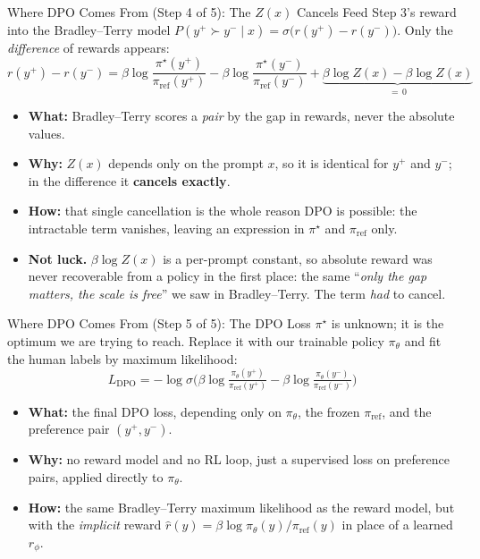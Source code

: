 \begin{frame}{Where DPO Comes From (Step 4 of 5): The $Z(x)$ Cancels}
Feed Step 3's reward into the Bradley--Terry model
$P(y^+\!\succ y^-\mid x)=\sigma\big(r(y^+)-r(y^-)\big)$. Only the \emph{difference}
of rewards appears:
\[
    r(y^+) - r(y^-) =
    \beta\log\frac{\pi^\star(y^+)}{\pi_{\text{ref}}(y^+)}
    - \beta\log\frac{\pi^\star(y^-)}{\pi_{\text{ref}}(y^-)}
    + \underbrace{\beta\log Z(x) - \beta\log Z(x)}_{=\, 0}
\]
\begin{itemize}\itemsep0.45em\small
    \item \textbf{What:} Bradley--Terry scores a \emph{pair} by the gap in rewards,
          never the absolute values.
    \item \textbf{Why:} $Z(x)$ depends only on the prompt $x$, so it is identical
          for $y^+$ and $y^-$; in the difference it \textbf{cancels exactly}.
    \item \textbf{How:} that single cancellation is the whole reason DPO is
          possible: the intractable term vanishes, leaving an expression in
          $\pi^\star$ and $\pi_{\text{ref}}$ only.
    \item \textbf{Not luck.} $\beta\log Z(x)$ is a per-prompt constant, so absolute
          reward was never recoverable from a policy in the first place: the same
          ``\emph{only the gap matters, the scale is free}'' we saw in
          Bradley--Terry. The term \emph{had} to cancel.
\end{itemize}
\end{frame}

\begin{frame}{Where DPO Comes From (Step 5 of 5): The DPO Loss}
$\pi^\star$ is unknown; it is the optimum we are trying to reach. Replace it with
our trainable policy $\pi_\theta$ and fit the human labels by maximum likelihood:
\[
    L_{\mathrm{DPO}} = -\log\sigma\!\Big(
        \beta\log\tfrac{\pi_\theta(y^+)}{\pi_{\text{ref}}(y^+)}
        - \beta\log\tfrac{\pi_\theta(y^-)}{\pi_{\text{ref}}(y^-)}\Big)
\]
\begin{itemize}\itemsep0.45em\small
    \item \textbf{What:} the final DPO loss, depending only on $\pi_\theta$,
          the frozen $\pi_{\text{ref}}$, and the preference pair $(y^+, y^-)$.
    \item \textbf{Why:} no reward model and no RL loop, just a supervised loss on
          preference pairs, applied directly to $\pi_\theta$.
    \item \textbf{How:} the same Bradley--Terry maximum likelihood as the reward
          model, but with the \emph{implicit} reward
          $\hat r(y)=\beta\log\pi_\theta(y)/\pi_{\text{ref}}(y)$ in place of a
          learned $r_\phi$.
\end{itemize}
\end{frame}

